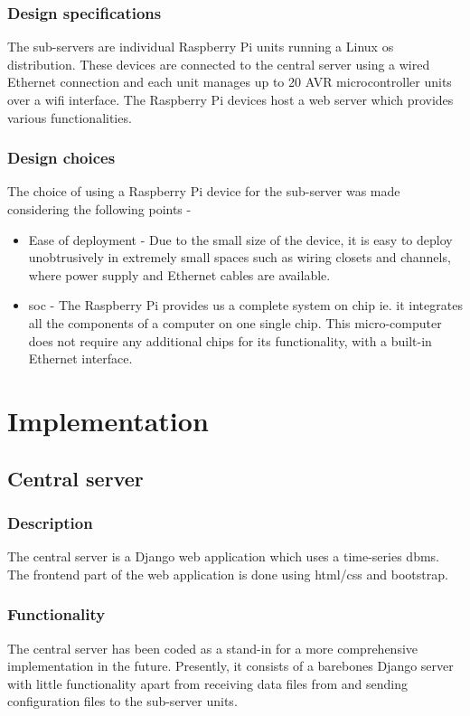 \documentclass[letterpaper,11pt]{report}
\begin{document}
\subsection{Design specifications}
The sub-servers are individual Raspberry Pi units running a Linux \ac{os} distribution. These devices are connected to the central server using a wired Ethernet connection and each unit manages up to 20 AVR microcontroller units over a \ac{wifi} interface. The Raspberry Pi devices host a web server which provides various functionalities.
\subsection{Design choices}
The choice of using a Raspberry Pi device for the sub-server was made considering the following points -
\begin{itemize}
    \item Ease of deployment - Due to the small size of the device, it is easy to deploy unobtrusively in extremely small spaces such as wiring closets and channels, where power supply and Ethernet cables are available.
    \item \ac{soc} - The Raspberry Pi provides us a complete system on chip ie. it integrates all the components of a computer on one single chip. This micro-computer does not require any additional chips for its functionality, with a built-in Ethernet interface.
\end{itemize}

\newpage
\chapter{Implementation}\label{chapter:Implementation}
\onehalfspacing
\section{Central server}
\subsection{Description}
The central server is a Django web application which uses a time-series \ac{dbms}. The frontend part of the web application is done using \ac{html}/\ac{css} and bootstrap.
\subsection{Functionality}
The central server has been coded as a stand-in for a more comprehensive implementation in the future. Presently, it consists of a barebones Django server with little functionality apart from receiving data files from  and sending configuration files to the sub-server units.
\end{document}
